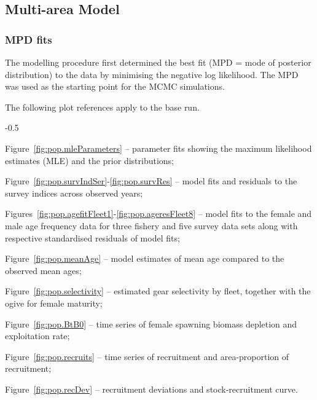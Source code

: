 \documentclass[11pt]{book}
\begin{document}
\subsection{Multi-area Model}
\subsubsection{MPD fits}\label{sss:MPD}


The modelling procedure first determined the best fit (MPD = mode of posterior distribution) to the data by minimising the negative log likelihood.
The MPD was used as the starting point for the MCMC simulations.

The following plot references apply to the base run.
\begin{itemize_csas}{-0.5}{}
  \item Figure~\ref{fig:pop.mleParameters} -- parameter fits showing the maximum likelihood estimates (MLE) and the prior distributions;
  \item Figure~\ref{fig:pop.survIndSer}-\ref{fig:pop.survRes} -- model fits and residuals to the survey indices across observed years;
  \item Figures~\ref{fig:pop.agefitFleet1}-\ref{fig:pop.ageresFleet8} -- model fits to the female and male age frequency data for three fishery and five survey data sets along with respective standardised residuals of model fits;
  \item Figure~\ref{fig:pop.meanAge} -- model estimates of mean age compared to the observed mean ages;
  \item Figure~\ref{fig:pop.selectivity} -- estimated gear selectivity  by fleet, together with the ogive for female maturity;
  \item Figure~\ref{fig:pop.BtB0} -- time series of female spawning biomass depletion and exploitation rate;
  \item Figure~\ref{fig:pop.recruits} -- time series of recruitment and area-proportion of recruitment;
  \item Figure~\ref{fig:pop.recDev} -- recruitment deviations and stock-recruitment curve.
\end{itemize_csas}
\end{document}
